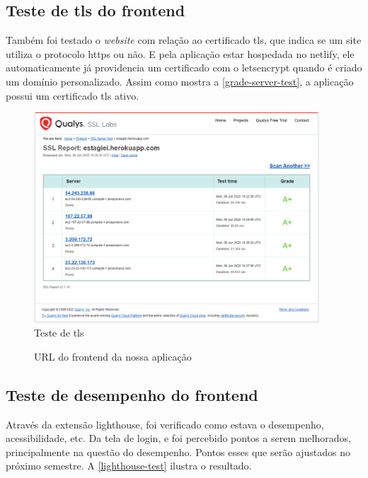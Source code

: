 \subsection{Teste de \ac{tls} do \gls{frontend}}
Também foi testado o \emph{website} com relação ao certificado \ac{tls}, que indica se um site utiliza o protocolo \ac{https} ou não. E pela aplicação estar hospedada no \gls{netlify}, ele automaticamente já providencia um certificado com o \gls{letsencrypt} quando é criado um domínio personalizado. Assim como mostra a \autoref{grade-server-test}, a aplicação possui um certificado \ac{tls} ativo.

\begin{figure}[H]
	\centering
	\caption{\label{grade-server-test}Teste de \ac{tls}}
	\includegraphics[width=0.95\textwidth]{../imagens/web-tests/grade-server-test.png}
\end{figure}

\begin{figure}[htb]
	\caption{\label{qr-url-frontend}URL do \gls{frontend} da nossa aplicação}
	\begin{center}
	\end{center}
\end{figure}

\subsection{Teste de desempenho do \gls{frontend}}
Através da extensão \gls{lighthouse}, foi verificado como estava o desempenho, acessibilidade, etc. Da tela de login, e foi percebido pontos a serem melhorados, principalmente na questão do desempenho. Pontos esses que serão ajustados no próximo semestre. A \autoref{lighthouse-test} ilustra o resultado.

